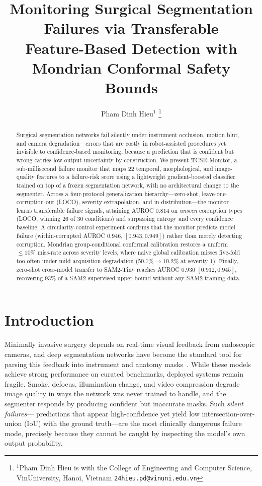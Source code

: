 \documentclass[letterpaper, 10 pt, conference]{ieeeconf}  %
\title{\LARGE \bf
Monitoring Surgical Segmentation Failures via Transferable\\
Feature-Based Detection with Mondrian Conformal Safety Bounds}
\author{Pham Dinh Hieu$^{1}$%
\thanks{$^{1}$Pham Dinh Hieu is with the College of Engineering and Computer
Science, VinUniversity, Hanoi, Vietnam
        {\tt\small 24hieu.pd@vinuni.edu.vn}}%
}
\newcommand{\monitor}{TCSR-Monitor}
\begin{document}
\maketitle
\thispagestyle{empty}
\pagestyle{empty}

\begin{abstract}
Surgical segmentation networks fail silently under instrument occlusion,
motion blur, and camera degradation---errors that are costly in
robot-assisted procedures yet invisible to confidence-based monitoring,
because a prediction that is confident but wrong carries low output
uncertainty by construction. We present \monitor{}, a sub-millisecond
failure monitor that maps $22$ temporal, morphological, and image-quality
features to a failure-risk score using a lightweight gradient-boosted
classifier trained on top of a frozen segmentation network, with no
architectural change to the segmenter. Across a four-protocol
generalization hierarchy---zero-shot, leave-one-corruption-out (LOCO),
severity extrapolation, and in-distribution---the monitor learns
transferable failure signals, attaining AUROC $0.814$ on \emph{unseen}
corruption types (LOCO; winning $26$ of $30$ conditions) and surpassing
entropy and every confidence baseline. A circularity-control experiment
confirms that the monitor predicts model failure (within-corrupted AUROC
$0.946$, $[0.943, 0.949]$) rather than merely detecting corruption.
Mondrian group-conditional conformal calibration restores a uniform
$\le 10\%$ miss-rate across severity levels, where naive global calibration
misses five-fold too often under mild acquisition degradation
($50.7\% \rightarrow 10.2\%$ at severity $1$). Finally, zero-shot
cross-model transfer to SAM2-Tiny reaches AUROC $0.930$ $[0.912, 0.945]$,
recovering $93\%$ of a SAM2-supervised upper bound without any SAM2 training
data.
\end{abstract}

\section{Introduction}

Minimally invasive surgery depends on real-time visual feedback from
endoscopic cameras, and deep segmentation networks have become the standard
tool for parsing this feedback into instrument and anatomy
masks~\cite{ref:shvets, ref:allan}. While these models achieve strong
performance on curated benchmarks, deployed systems remain fragile. Smoke,
defocus, illumination change, and video compression degrade image quality in
ways the network was never trained to handle, and the segmenter responds by
producing confident but inaccurate masks. Such \emph{silent failures}---%
predictions that appear high-confidence yet yield low intersection-over-union
(IoU) with the ground truth---are the most clinically dangerous failure
mode, precisely because they cannot be caught by inspecting the model's own
output probability.
\end{document}
